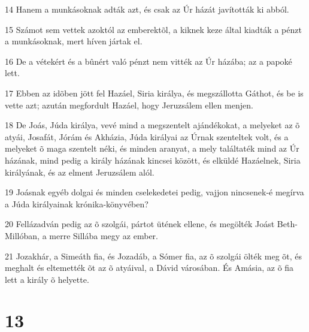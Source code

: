 \par 14 Hanem a munkásoknak adták azt, és csak az Úr házát javították ki abból.
\par 15 Számot sem vettek azoktól az emberektõl, a kiknek keze által kiadták a pénzt a munkásoknak, mert híven jártak el.
\par 16 De a vétekért és a bûnért való pénzt nem vitték az Úr házába; az a papoké lett.
\par 17 Ebben az idõben jött fel Hazáel, Siria királya, és megszállotta Gáthot, és be is vette azt; azután megfordult Hazáel, hogy Jeruzsálem ellen menjen.
\par 18 De Joás, Júda királya, vevé mind a megszentelt ajándékokat, a melyeket az õ atyái, Josafát, Jórám és Akházia, Júda királyai az Úrnak szenteltek volt, és a melyeket õ maga szentelt néki, és minden aranyat, a mely találtaték mind az Úr házának, mind pedig a király házának kincsei között, és elküldé Hazáelnek, Siria királyának, és az elment Jeruzsálem alól.
\par 19 Joásnak egyéb dolgai és minden cselekedetei pedig, vajjon nincsenek-é megírva a Júda királyainak krónika-könyvében?
\par 20 Fellázadván pedig az õ szolgái, pártot ütének ellene, és megölték Joást Beth-Millóban, a merre Sillába megy az ember.
\par 21 Jozakhár, a Simeáth fia, és Jozadáb, a Sómer fia, az õ szolgái ölték meg õt, és meghalt és eltemették õt az õ atyáival, a Dávid városában. És Amásia, az õ fia lett a király õ helyette.

\chapter{13}

